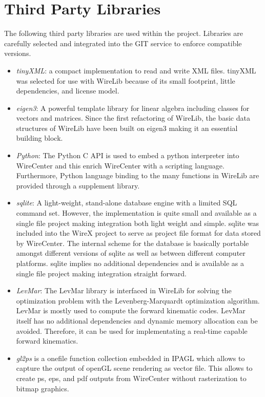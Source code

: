\documentclass[11pt,a4paper,onepage,openany]{book}
\begin{document}
\section{Third Party Libraries}
The following third party libraries are used within the project. Libraries are
carefully selected and integrated into the GIT service to enforce compatible
versions.
\begin{itemize}
  \item \emph{tinyXML}: a compact implementation to read and write XML
      files.
      tinyXML was selected for use with WireLib because of its small
      footprint, little dependencies, and license model.

  \item \emph{eigen3}: A powerful template library for linear algebra
      including classes for vectors and matrices. Since the first refactoring
      of WireLib, the basic data structures of WireLib have been built on
      eigen3 making it an essential building block.

  \item \emph{Python}: The Python C API is used to embed a python interpreter
      into WireCenter and this enrich WireCenter with a scripting language.
      Furthermore, Python language binding to the many functions in WireLib
      are provided through a supplement library.

  \item \emph{sqlite}: A light-weight, stand-alone database engine with a
    limited SQL command set. However, the implementation is quite small and
    available as a single file project making integration both light weight
    and simple. sqlite was included into the WireX project to serve as
    project file format for data stored by WireCenter. The internal scheme
    for the database is basically portable amongst different versions of
    sqlite as well as between different computer platforms. sqlite implies no
    additional dependencies and is available as a single file project making
    integration straight forward.

  \item \emph{LevMar}: The LevMar library is interfaced in WireLib for
      solving the optimization problem with the Levenberg-Marquardt
      optimization algorithm. LevMar is mostly used to compute the forward
      kinematic codes. LevMar itself has no additional dependencies and
      dynamic memory allocation can be avoided. Therefore, it can be used
      for implementating a real-time capable forward kinematics.

  \item \emph{gl2ps} is a onefile function collection embedded in IPAGL which
      allows to capture the output of openGL scene rendering as vector file.
      This allows to create ps, eps, and pdf outputs from WireCenter without
      rasterization to bitmap graphics.
\end{itemize}
\end{document}
